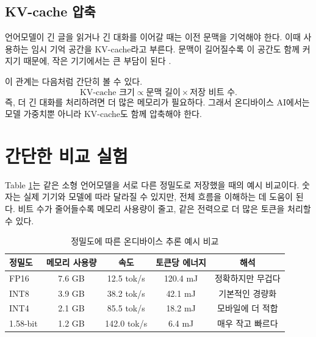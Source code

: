 \documentclass[twocolumn,10pt]{article}
\begin{document}
\subsection{KV-cache 압축}
언어모델이 긴 글을 읽거나 긴 대화를 이어갈 때는 이전 문맥을 기억해야 한다. 이때 사용하는 임시 기억 공간을 KV-cache라고 부른다. 문맥이 길어질수록 이 공간도 함께 커지기 때문에, 작은 기기에서는 큰 부담이 된다 \cite{kvquant2024}.

이 관계는 다음처럼 간단히 볼 수 있다.
\begin{equation}
\text{KV-cache 크기} \propto \text{문맥 길이} \times \text{저장 비트 수}.
\label{eq:ko_kv_simple}
\end{equation}
즉, 더 긴 대화를 처리하려면 더 많은 메모리가 필요하다. 그래서 온디바이스 AI에서는 모델 가중치뿐 아니라 KV-cache도 함께 압축해야 한다.

\section{간단한 비교 실험}
Table \ref{tab:ko_results}는 같은 소형 언어모델을 서로 다른 정밀도로 저장했을 때의 예시 비교이다. 숫자는 실제 기기와 모델에 따라 달라질 수 있지만, 전체 흐름을 이해하는 데 도움이 된다. 비트 수가 줄어들수록 메모리 사용량이 줄고, 같은 전력으로 더 많은 토큰을 처리할 수 있다.

\begin{table}[t]
\centering
\caption{정밀도에 따른 온디바이스 추론 예시 비교}
\label{tab:ko_results}
\begin{tabular}{lcccc}
\toprule
\textbf{정밀도} & \textbf{메모리 사용량} & \textbf{속도} & \textbf{토큰당 에너지} & \textbf{해석} \\
\midrule
FP16 & 7.6 GB & 12.5 tok/s & 120.4 mJ & 정확하지만 무겁다 \\
INT8 & 3.9 GB & 38.2 tok/s & 42.1 mJ & 기본적인 경량화 \\
INT4 & 2.1 GB & 85.5 tok/s & 18.2 mJ & 모바일에 더 적합 \\
\rowcolor{EdgeGreen!10}
1.58-bit & 1.2 GB & 142.0 tok/s & 6.4 mJ & 매우 작고 빠르다 \\
\bottomrule
\end{tabular}
\end{table}
\end{document}

